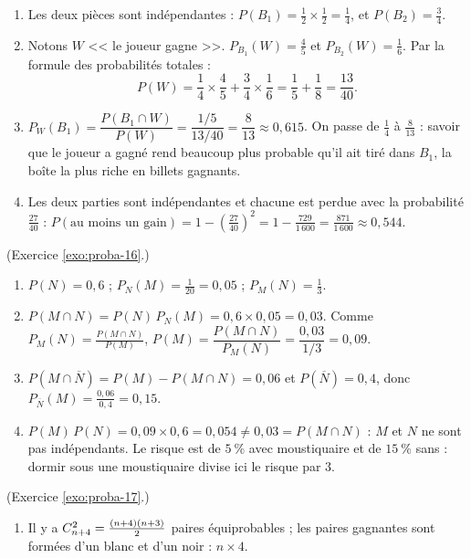 \begin{corrige}
\begin{sol}
\begin{enumerate}
\item Les deux pi\`eces sont ind\'ependantes : $P(B_1) = \frac{1}{2}\times\frac{1}{2} = \frac{1}{4}$, et $P(B_2) = \frac{3}{4}$.
\item Notons $W$ << le joueur gagne >>. $P_{B_1}(W) = \frac{4}{5}$ et $P_{B_2}(W) = \frac{1}{6}$. Par la formule des probabilit\'es totales :
      \[
      P(W) = \frac{1}{4}\times\frac{4}{5} + \frac{3}{4}\times\frac{1}{6} = \frac{1}{5} + \frac{1}{8} = \frac{13}{40}.
      \]
\item $P_W(B_1) = \dfrac{P(B_1\cap W)}{P(W)} = \dfrac{1/5}{13/40} = \dfrac{8}{13}\approx 0,615$.
      On passe de $\frac{1}{4}$ \`a $\frac{8}{13}$ : savoir que le joueur a gagn\'e rend beaucoup plus probable qu'il ait tir\'e dans $B_1$,
      la bo\^ite la plus riche en billets gagnants.
\item Les deux parties sont ind\'ependantes et chacune est perdue avec la probabilit\'e $\frac{27}{40}$ :
      $P(\text{au moins un gain}) = 1 - \left(\frac{27}{40}\right)^2 = 1 - \frac{729}{1\,600} = \frac{871}{1\,600}\approx 0,544$.
\end{enumerate}
\end{sol}
%
\begin{sol} (Exercice \ref{exo:proba-16}.)
\begin{enumerate}
\item $P(N) = 0,6$ ; $P_N(M) = \frac{1}{20} = 0,05$ ; $P_M(N) = \frac{1}{3}$.
\item $P(M\cap N) = P(N)\,P_N(M) = 0,6\times 0,05 = 0,03$. Comme $P_M(N) = \frac{P(M\cap N)}{P(M)}$,
      $P(M) = \dfrac{P(M\cap N)}{P_M(N)} = \dfrac{0,03}{1/3} = 0,09$.
\item $P(M\cap\overline{N}) = P(M) - P(M\cap N) = 0,06$ et $P(\overline{N}) = 0,4$, donc
      $P_{\overline{N}}(M) = \frac{0,06}{0,4} = 0,15$.
\item $P(M)\,P(N) = 0,09\times 0,6 = 0,054 \neq 0,03 = P(M\cap N)$ : $M$ et $N$ ne sont pas ind\'ependants.
      Le risque est de $5~\%$ avec moustiquaire et de $15~\%$ sans : dormir sous une moustiquaire divise ici le risque par $3$.
\end{enumerate}
\end{sol}
%
\begin{sol} (Exercice \ref{exo:proba-17}.)
\begin{enumerate}
\item Il y a $C_{n+4}^{2} = \frac{(n+4)(n+3)}{2}$ paires \'equiprobables ; les paires gagnantes sont form\'ees d'un blanc et d'un noir : $n\times 4$.

\end{enumerate}
\end{sol}
\end{corrige}

